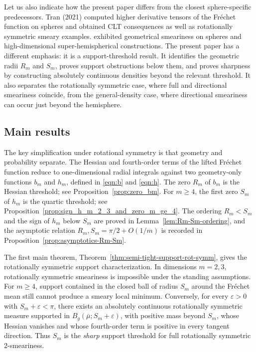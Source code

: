 \documentclass{amsart}
\theoremstyle{definition}
\theoremstyle{remark}
\newcommand{\mubar}{\bar{\mu}}
\newcommand\0{\boldsymbol{0}}
\begin{document}
Let us also indicate how the present paper differs from the closest sphere-specific predecessors. Tran (2021) computed higher derivative tensors of the Fréchet function on spheres and obtained CLT consequences as well as rotationally symmetric smeary examples. \citet{Eltzner2022GeometricalSmeariness} exhibited geometrical smeariness on spheres and high-dimensional super-hemispherical constructions. The present paper has a different emphasis: it is a support-threshold result. It identifies the geometric radii \(R_m\) and \(S_m\), proves support obstructions below them, and proves sharpness by constructing absolutely continuous densities beyond the relevant threshold. It also separates the rotationally symmetric case, where full and directional smeariness coincide, from the general-density case, where directional smeariness can occur just beyond the hemisphere.

\subsection{Main results}

The key simplification under rotational symmetry is that geometry and probability separate.  The Hessian and fourth-order terms of the lifted Fr\'echet function reduce to one-dimensional radial integrals against two geometry-only functions \(b_m\) and \(h_m\), defined in \eqref{eqn:b} and \eqref{eqn:h}.  The zero \(R_m\) of \(b_m\) is the Hessian threshold; see Proposition~\ref{prop:zero_bm}.  For \(m\ge4\), the first zero \(S_m\) of \(h_m\) is the quartic threshold; see Proposition~\ref{prop:sign_h_m_2_3_and_zero_m_ge_4}.  The ordering \(R_m<S_m\) and the sign of \(h_m\) below \(S_m\) are proved in Lemma~\ref{lem:Rm-Sm-ordering}, and the asymptotic relation \(R_m,S_m=\pi/2+O(1/m)\) is recorded in Proposition~\ref{prop:asymptotics-Rm-Sm}.

The first main theorem, Theorem~\ref{thm:semi-tight-support-rot-symm}, gives the rotationally symmetric support characterization.  In dimensions \(m=2,3\), rotationally symmetric smeariness is impossible under the standing assumptions.  For \(m\ge4\), support contained in the closed ball of radius \(S_m\) around the Fr\'echet mean still cannot produce a smeary local minimum.  Conversely, for every \(\varepsilon>0\) with \(S_m+\varepsilon<\pi\), there exists an absolutely continuous rotationally symmetric measure supported in \(B_g(\mubar;S_m+\varepsilon)\), with positive mass beyond \(S_m\), whose Hessian vanishes and whose fourth-order term is positive in every tangent direction.  Thus \(S_m\) is the \textit{sharp} support threshold for full rotationally symmetric \(2\)-smeariness.
\end{document}
